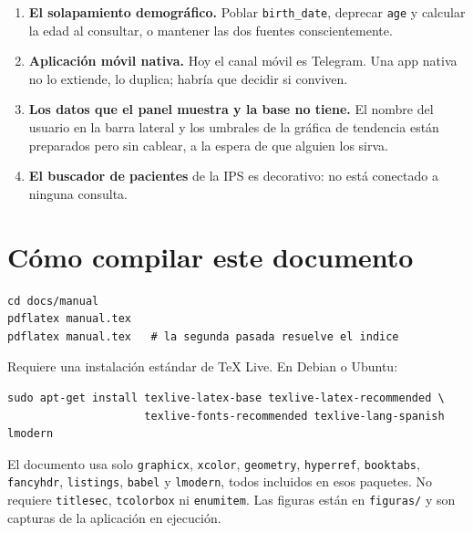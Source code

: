 \documentclass[11pt,a4paper]{article}
\begin{document}
\begin{enumerate}
\item \textbf{El solapamiento demográfico.} Poblar \texttt{birth\_date},
  deprecar \texttt{age} y calcular la edad al consultar, o mantener las dos
  fuentes conscientemente.
\item \textbf{Aplicación móvil nativa.} Hoy el canal móvil es Telegram. Una
  app nativa no lo extiende, lo duplica; habría que decidir si conviven.
\item \textbf{Los datos que el panel muestra y la base no tiene.} El nombre
  del usuario en la barra lateral y los umbrales de la gráfica de tendencia
  están preparados pero sin cablear, a la espera de que alguien los sirva.
\item \textbf{El buscador de pacientes} de la IPS es decorativo: no está
  conectado a ninguna consulta.
\end{enumerate}

\appendix
\newpage
\section{Cómo compilar este documento}

\begin{lstlisting}
cd docs/manual
pdflatex manual.tex
pdflatex manual.tex   # la segunda pasada resuelve el indice
\end{lstlisting}

Requiere una instalación estándar de TeX Live. En Debian o Ubuntu:

\begin{lstlisting}
sudo apt-get install texlive-latex-base texlive-latex-recommended \
                     texlive-fonts-recommended texlive-lang-spanish lmodern
\end{lstlisting}

El documento usa solo \texttt{graphicx}, \texttt{xcolor}, \texttt{geometry},
\texttt{hyperref}, \texttt{booktabs}, \texttt{fancyhdr}, \texttt{listings},
\texttt{babel} y \texttt{lmodern}, todos incluidos en esos paquetes. No
requiere \texttt{titlesec}, \texttt{tcolorbox} ni \texttt{enumitem}. Las figuras están en
\texttt{figuras/} y son capturas de la aplicación en ejecución.
\end{document}
